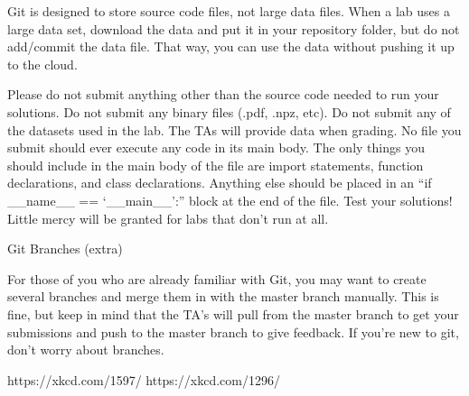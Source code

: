 Git is designed to store source code files, not large data files. When a lab uses a large data set, download the data and put it in your repository folder, but do not add/commit the data file. That way, you can use the data without pushing it up to the cloud.

Please do not submit anything other than the source code needed to run your solutions.
Do not submit any binary files (.pdf, .npz, etc).
Do not submit any of the datasets used in the lab. The TAs will provide data when grading.
No file you submit should ever execute any code in its main body. The only things you should include in the main body of the file are import statements, function declarations, and class declarations. Anything else should be placed in an “if \_\_name\_\_ == ‘\_\_main\_\_’:” block at the end of the file.
Test your solutions! Little mercy will be granted for labs that don’t run at all.

Git Branches (extra)

For those of you who are already familiar with Git, you may want to create several branches and merge them in with the master branch manually. This is fine, but keep in mind that the TA’s will pull from the master branch to get your submissions and push to the master branch to give feedback. If you’re new to git, don’t worry about branches.


https://xkcd.com/1597/
https://xkcd.com/1296/
